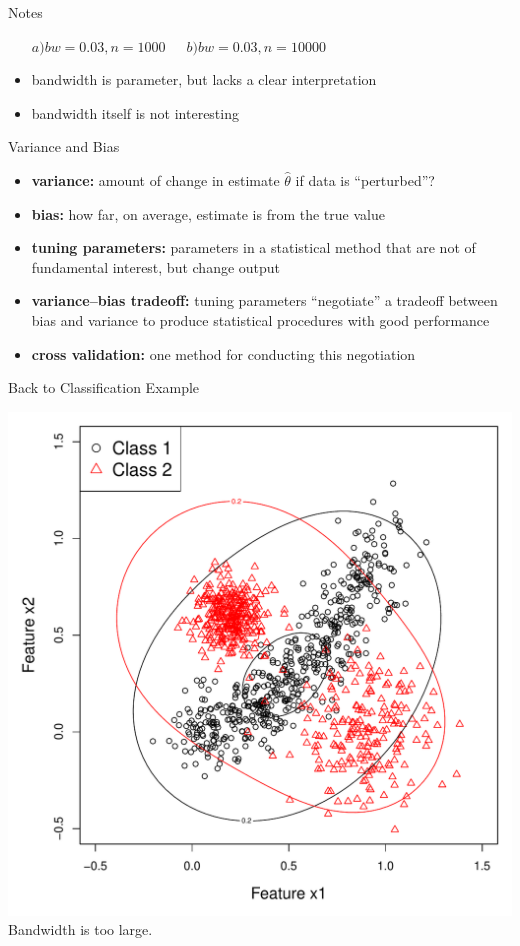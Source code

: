 \documentclass[12pt]{beamer}
\begin{document}
\begin{frame}{Notes}
\begin{itemize}
\begin{center}
      $a) bw=0.03, n = 1000 \, \, \, \, \,  \, \, \, \, b) bw=0.03, n=10000$
    \end{center}
  \item bandwidth is parameter, but lacks a clear interpretation
  \item bandwidth itself is not interesting
  \end{itemize}
\end{frame}

\begin{frame}{Variance and Bias}
  \begin{itemize}
  \item \textbf{variance:} amount of change in estimate $\widehat{\theta}$  if data is ``perturbed''?
  \item \textbf{bias:} how far, on average, estimate is from the true value
  \item \textbf{tuning parameters:} parameters in a statistical method that are not of fundamental interest, but change output
  \item \textbf{variance--bias tradeoff:} tuning parameters ``negotiate'' a tradeoff between bias and variance to produce statistical procedures with good performance
  \item \textbf{cross validation:} one method for conducting this negotiation
  \end{itemize}

\end{frame}



\begin{frame}{Back to Classification Example}

  \begin{center}
    \includegraphics[scale=0.4]{figs/kde2d3.pdf}\\
    Bandwidth is too large.
  \end{center}
  
\end{frame}
\end{document}
